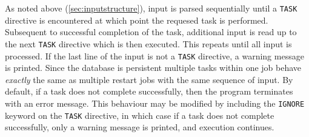As noted above (\ref{sec:inputstructure}), input is parsed
sequentially until a \verb+TASK+ directive is encountered at which
point the requesed task is performed.  Subsequent to successful
completion of the task, additional input is read up to the next
\verb+TASK+ directive which is then executed.  This repeats until all
input is processed.  If the last line of the input is not a
\verb+TASK+ directive, a warning message is printed.  Since the
database is persistent multiple tasks within one job behave {\em
  exactly} the same as multiple restart jobs with the same sequence of
input.  By default, if a task does not complete successfully, then
the program terminates with an error message.  This behaviour may
be modified by including the \verb+IGNORE+ keyword on the \verb+TASK+
directive, in which case if a task does not complete successfully, 
only a warning message is printed, and execution continues.

